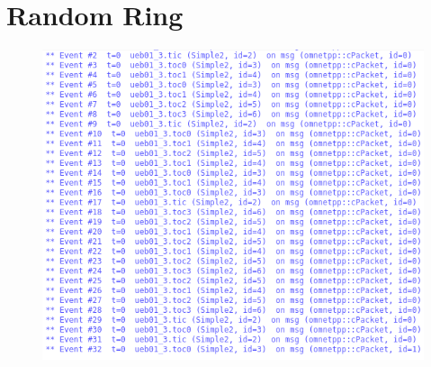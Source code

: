 \documentclass[]{scrartcl}
\begin{document}
\section{Random Ring}
\begin{figure}[ht]
    \centering
    \includegraphics[width=\columnwidth]{ueb01-3.png}
\end{figure}
\end{document}
